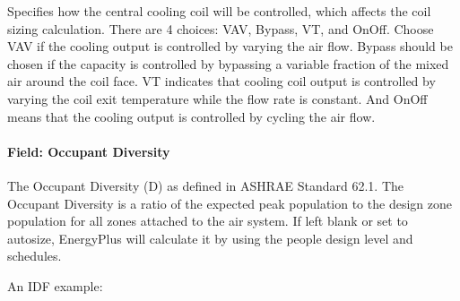 Specifies how the central cooling coil will be controlled, which affects the coil sizing calculation. There are 4 choices: VAV, Bypass, VT, and OnOff. Choose VAV if the cooling output is controlled by varying the air flow. Bypass should be chosen if the capacity is controlled by bypassing a variable fraction of the mixed air around the coil face. VT indicates that cooling coil output is controlled by varying the coil exit temperature while the flow rate is constant. And OnOff means that the cooling output is controlled by cycling the air flow.

\paragraph{Field: Occupant Diversity}\label{occupant-diversity}

The Occupant Diversity (D) as defined in ASHRAE Standard 62.1. The Occupant Diversity is a ratio of the expected peak population to the design zone population for all zones attached to the air system. If left blank or set to autosize, EnergyPlus will calculate it by using the people design level and schedules.

An IDF example:

